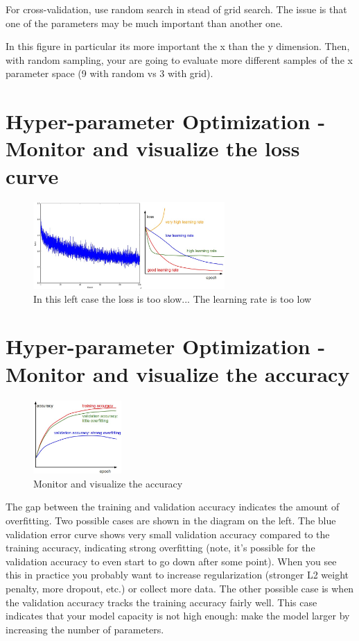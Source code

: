 For cross-validation, use random search in stead of grid search. The issue is that one of the parameters may be much important than another one.

In this figure in particular its more important the x than the y dimension. Then, with random sampling, your are going to evaluate more different samples of the x parameter space (9 with random vs 3 with grid).

\section*{Hyper-parameter Optimization - Monitor and visualize the loss curve}
\begin{figure}[h]
  \centering
  \includegraphics[width=0.65\textwidth]{Images/hyper_params_tun/10.png}
  \caption{In this left case the loss is too slow... The learning rate is too low}
\end{figure}


\section*{Hyper-parameter Optimization - Monitor and visualize the accuracy}
\begin{figure}[h]
  \centering
  \includegraphics[width=0.3\textwidth]{Images/hyper_params_tun/8.jpeg}
  \caption{Monitor and visualize the accuracy}
\end{figure}
The gap between the training and validation accuracy indicates the amount of overfitting. Two possible cases are shown in the diagram on the left. The blue validation error curve shows very small validation accuracy compared to the training accuracy, indicating strong overfitting (note, it's possible for the validation accuracy to even start to go down after some point). When you see this in practice you probably want to increase regularization (stronger L2 weight penalty, more dropout, etc.) or collect more data. The other possible case is when the validation accuracy tracks the training accuracy fairly well. This case indicates that your model capacity is not high enough: make the model larger by increasing the number of parameters.

